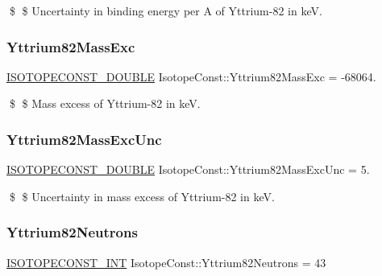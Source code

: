 \$ \$ Uncertainty in binding energy per A of Yttrium-\/82 in keV. \mbox{\label{group___isotope_const-_yttrium-_y82_gae288bcba9f0102942e3178adc7e8cef5}} 
\subsubsection{\texorpdfstring{Yttrium82\+Mass\+Exc}{Yttrium82MassExc}}
{\footnotesize\ttfamily \mbox{\hyperlink{group___isotope_const-_macros_ga8f45a7272ce02c0b4c65c44636ed719a}{I\+S\+O\+T\+O\+P\+E\+C\+O\+N\+S\+T\+\_\+\+D\+O\+U\+B\+LE}} Isotope\+Const\+::\+Yttrium82\+Mass\+Exc = -\/68064.}

\$ \$ Mass excess of Yttrium-\/82 in keV. \mbox{\label{group___isotope_const-_yttrium-_y82_gaa42e73f913b953f6c5b0bfc894df63ee}} 
\subsubsection{\texorpdfstring{Yttrium82\+Mass\+Exc\+Unc}{Yttrium82MassExcUnc}}
{\footnotesize\ttfamily \mbox{\hyperlink{group___isotope_const-_macros_ga8f45a7272ce02c0b4c65c44636ed719a}{I\+S\+O\+T\+O\+P\+E\+C\+O\+N\+S\+T\+\_\+\+D\+O\+U\+B\+LE}} Isotope\+Const\+::\+Yttrium82\+Mass\+Exc\+Unc = 5.}

\$ \$ Uncertainty in mass excess of Yttrium-\/82 in keV. \mbox{\label{group___isotope_const-_yttrium-_y82_ga85124656b8c322bb9711cf21237ca63f}} 
\subsubsection{\texorpdfstring{Yttrium82\+Neutrons}{Yttrium82Neutrons}}
{\footnotesize\ttfamily \mbox{\hyperlink{group___isotope_const-_macros_ga5f18360b3e99483a35c32d789e62621c}{I\+S\+O\+T\+O\+P\+E\+C\+O\+N\+S\+T\+\_\+\+I\+NT}} Isotope\+Const\+::\+Yttrium82\+Neutrons = 43}

